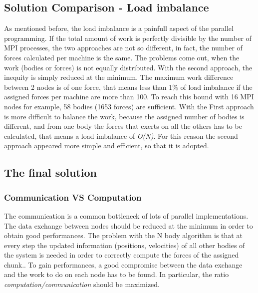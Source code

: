 \documentclass[a4paper]{article}
\begin{document}
\subsection{Solution Comparison - Load imbalance}
\label{sec:b_rep}
As mentioned before, the load imbalance is a painfull aspect of the parallel programming. If the total amount of work is perfectly divisible by the number of MPI processes, the two approaches are not so different, in fact, the number of forces calculated per machine is the same. The problems come out, when the work (bodies or forces) is not equally distributed. With the second approach, the inequity is simply reduced at the minimum. The maximum work difference between 2 nodes is of one force, that means less than 1\% of load imbalance if the assigned forces per machine are more than 100. To reach this bound with 16 MPI nodes for example, 58 bodies (1653 forces) are sufficient. With the First approach is more difficult to balance the work, because the assigned number of bodies is different, and from one body the forces that exerts on all the others has to be calculated, that means a load imbalance of \textit{O(N)}. For this reason the second approach appeared more simple and efficient, so that it is adopted.


\subsection{The final solution}
\label{sec:comm_comp}

\subsubsection{Communication VS Computation}
\label{sec:comm_comp}
The communication is a common bottleneck of lots of parallel implementations. The data exchange between nodes should be reduced at the minimum in order to obtain good performances. The problem with the N body algorithm is that at every step the updated information (positions, velocities) of all other bodies of the system is needed in order to correctly compute the forces of the assigned chunk.. To gain performances, a good compromise between the data exchange and the work to do on each node has to be found. In particular, the ratio \textit{computation/communication} should be maximized. 
\end{document}

